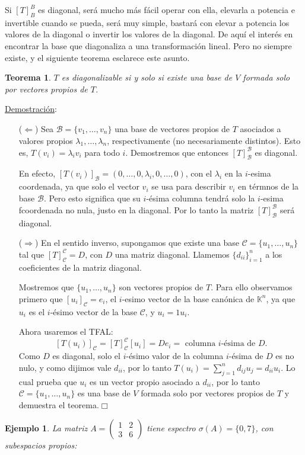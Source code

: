 \documentclass[12pt]{book}
\newtheorem{teo}{Teorema}
\newtheorem{ejem}{Ejemplo}
\def\K{\mathbb{K}}
\def\B{\mathcal{B}}
\def\Ccal{\mathcal{C}}
\begin{document}
Si $[T]_B^B$ es diagonal, será mucho más fácil operar con ella, elevarla a potencia e invertible cuando se pueda, será muy simple, bastará con elevar a potencia los valores de la diagonal o invertir los valores de la diagonal. 
De aquí el interés en encontrar la base que diagonaliza a una transformación lineal.
Pero no siempre existe, y el siguiente teorema esclarece este asunto.


\begin{teo}
$T$ es diagonalizable si y solo si existe una base de $V$ formada solo por vectores propios de $T$.
\end{teo}
\underline{Demostraci\'on}: {
\begin{itemize}
\item[($\Leftarrow$)] Sea $\B=\{v_1,\dots,v_n\}$ una base de vectores propios de $T$ asociados a valores propios $\lambda_1,\dots,\lambda_n$, respectivamente (no necesariamente distintos).
Esto es, $T(v_i)=\lambda_iv_i$ para todo $i$.
Demostremos que entonces $[T]_\B^\B$ es diagonal.

En efecto,  $[T(v_i)]_\B=(0,\dots,0,\lambda_i,0,\dots,0)$, con el $\lambda_i$ en la $i$-esima coordenada, ya que solo el vector $v_i$ se usa para describir $v_i$ en térmnos de la base $\B$.
Pero esto significa que su $i$-ésima columna tendrá solo la $i$-esima fcoordenada no nula, justo en la diagonal.
Por lo tanto la matriz $[T]_\B^\B$ será diagonal.
\item[($\Rightarrow$)] En el sentido inverso, supongamos que existe una base $\Ccal=\{u_1,\dots,u_n\}$ tal que $[T]_\Ccal^\Ccal=D$, con $D$ una matriz diagonal.
Llamemos $\{d_{ii}\}_{i=1}^n$ a los coeficientes de la matriz diagonal.

Mostremos que $\{u_1,\dots,u_n\}$ son vectores propios de $T$.
Para ello observamos primero que $[u_i]_\Ccal=e_i$, el $i$-esimo vector de la base canónica de $\K^n$, ya que $u_i$ es el $i$-ésimo vector de la base $\Ccal$, y $u_i=1u_i$.

Ahora usaremos el TFAL:
$$[T(u_i)]_\Ccal=[T]_\Ccal^\Ccal[u_i]=De_i=\textrm{ columna $i$-ésima de }D.$$
Como $D$ es diagonal, solo el $i$-ésimo valor de la columna $i$-ésima de $D$ es no nulo, y como dijimos vale $d_{ii}$, por lo tanto $T(u_i)=\sum_{j=1}^n d_{ij}u_j=d_{ii}u_i$.
Lo cual prueba que $u_i$ es un vector propio asociado a $d_{ii}$, por lo tanto $\Ccal=\{u_1,\dots,u_n\}$ es una base de $V$ formada solo por vectores propios de $T$ y demuestra el teorema.\hfill $\Box$
\end{itemize}
\begin{ejem} {\em 
La matriz $A=\left(\begin{matrix}1 & 2\\ 3 & 6 \end{matrix}\right)$ tiene espectro $\sigma(A)=\{0,7\}$, con subespacios propios:\\

}
\end{ejem}}
\end{document}
